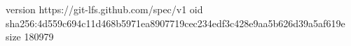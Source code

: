 version https://git-lfs.github.com/spec/v1
oid sha256:4d559c694c11d468b5971ea8907719cec234edf3c428e9aa5b626d39a5af619e
size 180979
